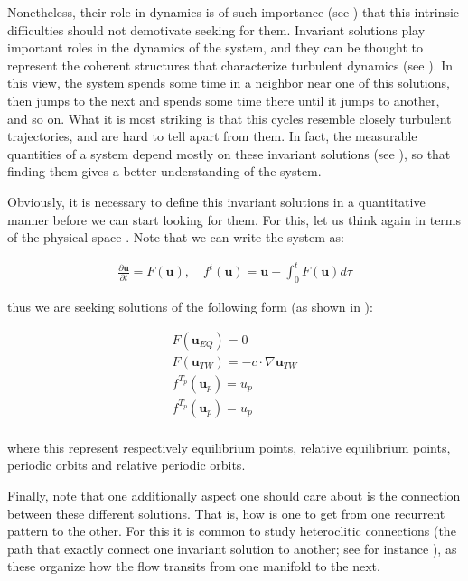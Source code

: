 Nonetheless, their role in dynamics is of such importance (see ) that this intrinsic difficulties should not demotivate seeking for them. Invariant solutions play important roles in the dynamics of the system, and they can be thought to represent the coherent structures that characterize turbulent dynamics (see ). In this view, the system spends some time in a neighbor near one of this solutions, then jumps to the next and spends some time there until it jumps to another, and so on. What it is most striking is that this cycles resemble closely turbulent trajectories, and are hard to tell apart from them. In fact, the measurable quantities of a system depend mostly on these invariant solutions (see ), so that finding them gives a better understanding of the system.

Obviously, it is necessary to define this invariant solutions in a quantitative manner before we can start looking for them. For this, let us think again in terms of the physical space . Note that we can write the system as:

\begin{eqnarray}
\frac{\partial \textbf{u}}{\partial t}=F(\textbf{u}), \quad f^{t}(\textbf{u})=\textbf{u}+\int_{0}^{t}{F(\textbf{u}) d \tau}
\label{NS4}
\end{eqnarray}

thus we are seeking solutions of the following form (as shown in ):

\begin{eqnarray}
F(\textbf{u}_{EQ})=0 \nonumber \\
F(\textbf{u}_{TW})=-c \cdot \nabla \textbf{u}_{TW} \nonumber \\
f^{T_p}(\textbf{u}_{p})=u_p \nonumber \\
f^{T_p}(\textbf{u}_{p})=u_p \nonumber \\
\label{NS_Solutions}
\end{eqnarray} 

where this represent respectively equilibrium points, relative equilibrium points, periodic orbits and relative periodic orbits.

Finally, note that one additionally aspect  one should care about is the connection between these different solutions. That is, how is one to get from one recurrent pattern to the other. For this it is common to study heteroclitic connections (the path that exactly connect one invariant solution to another; see for instance ), as these organize how the flow transits from one manifold to the next.

